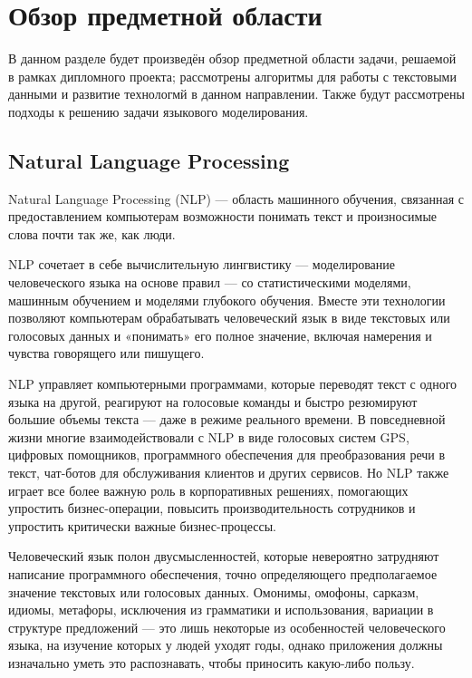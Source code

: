 \section{Обзор предметной области}
\label{sec:domain}

В данном разделе будет произведён обзор предметной области задачи, решаемой в рамках дипломного проекта; рассмотрены алгоритмы для работы с текстовыми данными и развитие технологмй в данном направлении. Также будут рассмотрены подходы к решению задачи языкового моделирования.

\subsection{Natural Language Processing}
\label{sub:domain:nlp}

Natural Language Processing (NLP) --- область машинного обучения, связанная с предоставлением компьютерам возможности понимать текст и произносимые слова почти так же, как люди.

NLP сочетает в себе вычислительную лингвистику — моделирование человеческого языка на основе правил — со статистическими моделями, машинным обучением и моделями глубокого обучения. Вместе эти технологии позволяют компьютерам обрабатывать человеческий язык в виде текстовых или голосовых данных и «понимать» его полное значение, включая намерения и чувства говорящего или пишущего.

NLP управляет компьютерными программами, которые переводят текст с одного языка на другой, реагируют на голосовые команды и быстро резюмируют большие объемы текста — даже в режиме реального времени. В повседневной жизни многие взаимодействовали с NLP в виде голосовых систем GPS, цифровых помощников, программного обеспечения для преобразования речи в текст, чат-ботов для обслуживания клиентов и других сервисов. Но NLP также играет все более важную роль в корпоративных решениях, помогающих упростить бизнес-операции, повысить производительность сотрудников и упростить критически важные бизнес-процессы.

Человеческий язык полон двусмысленностей, которые невероятно затрудняют написание программного обеспечения, точно определяющего предполагаемое значение текстовых или голосовых данных. Омонимы, омофоны, сарказм, идиомы, метафоры, исключения из грамматики и использования, вариации в структуре предложений — это лишь некоторые из особенностей человеческого языка, на изучение которых у людей уходят годы, однако приложения должны изначально уметь это распознавать, чтобы приносить какую-либо пользу.

